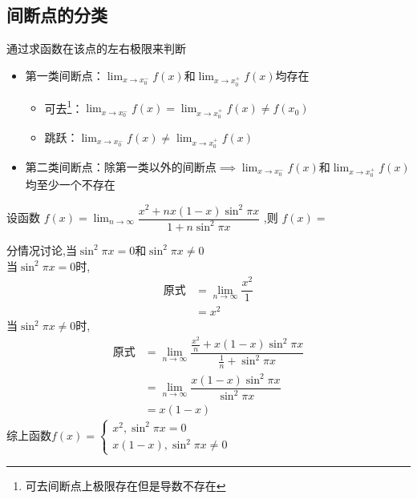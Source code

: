 \documentclass[8pt a4paper, oneside, UTF8]{ctexbook}
\begin{document}
\begin{sloppypar}
    \subsection{间断点的分类}
    通过求函数在该点的左右极限来判断
    \begin{itemize}
        \item 第一类间断点：$\lim _ { x \rightarrow x _ { 0 } ^{-}} f ( x )$​ 和$\lim _ { x \rightarrow x _ { 0 }^ {+}} f ( x )$​ 均存在
              \begin{itemize}
                  \item 可去\footnote{可去间断点上极限存在但是导数不存在}：$\lim _ { x \rightarrow x_0 ^ { - } } f ( x ) = \lim _ { x \rightarrow x_0^{+} } f  ( x ) \neq f(x_0)$
                  \item 跳跃：$\lim _ { x \rightarrow x_0^{-} } f ( x ) \not= \lim _ { x \rightarrow x_0^{+} } f ( x )$
              \end{itemize}
        \item 第二类间断点：除第一类以外的间断点$\implies \lim _ { x \rightarrow x _ { 0 } ^{-}} f ( x )$和$\lim _ { x \rightarrow x _ { 0 }^ {+}} f ( x )$​ 均至少一个不存在
    \end{itemize}
    \begin{problem}
        设函数 $f(x)=\lim_{n\to\infty}\dfrac{x^2+nx(1-x)\sin^2\pi x}{1+ n \sin^2 \pi x}$ ,则 $f(x)=$ 
    \end{problem}
    \begin{solution}
        分情况讨论,当$\sin^2 \pi x = 0$和$\sin^2 \pi x \neq 0$\\
        当$\sin^2 \pi x = 0$时,
        \begin{align*}
          \text{原式} & = \lim_{n\to \infty}\dfrac{x^2}{1} \\
          & =  x^2
        \end{align*}
        当$\sin^2 \pi x \neq 0$时,
        \begin{align*}
          \text{原式} & = \lim_{n\to \infty} \dfrac{\frac{x^2}{n}+x(1-x)\sin^2 \pi x}{\frac{1}{n}+\sin^2 \pi x} \\
          & = \lim_{n\to \infty} \dfrac{x(1-x)\sin^2 \pi x}{\sin^2 \pi x}\\
          & = x(1-x)
        \end{align*}
    综上函数$f(x)=\begin{cases}
        x^2 ,\sin^2 \pi x=0\\
        x(1-x),\sin^2 \pi x \neq 0
    \end{cases}$

\end{solution}
\end{sloppypar}
\end{document}
